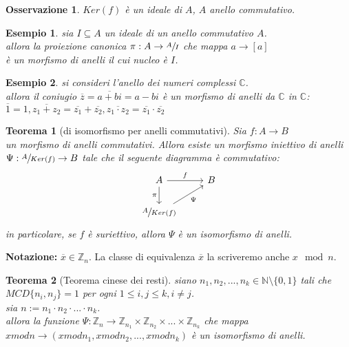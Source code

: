 \documentclass[a4paper,12pt]{article}
\theoremstyle{def}
\theoremstyle{prop}
\theoremstyle{esempio}
\newtheorem*{example}{Esempio}
\theoremstyle{dimostrazione}
\theoremstyle{teo}
\newtheorem*{teorema}{Teorema}
\theoremstyle{osservazione}
\newtheorem*{osservazione}{Osservazione}
\begin{document}
\begin{osservazione}
    \(Ker(f)\) è un ideale di \(A\), \(A\) anello commutativo.
\end{osservazione}

\begin{example}
    sia \(I \subseteq A\) un ideale di un anello commutativo \(A\).\\
    allora la proiezione canonica \(\pi : A \rightarrow \sfrac{A}{I}\) che mappa \(a \rightarrow [a]\)\\
    è un morfismo di anelli il cui nucleo è \(I\).
\end{example}

\begin{example}
    si consideri l'anello dei numeri complessi \(\mathbb{C}\).\\
    allora il coniugio \(\overline{z} = \overline{a+bi} = a - bi\) è un morfismo di anelli da \(\mathbb{C}\) in \(\mathbb{C}\):\\
    \(\overline{1} = 1, \overline{z_1 + z_2} = \overline{z_1} + \overline{z_2}, \overline{z_1 \cdot z_2} = \overline{z_1} \cdot \overline{z_2}\)
\end{example}

\begin{teorema}[di isomorfismo per anelli commutativi]
    Sia \(f : A \rightarrow B\)\\
    un morfismo di anelli commutativi. Allora esiste un morfismo iniettivo di anelli\\
    \(\Psi : \sfrac{A}{Ker(f)} \rightarrow B\) tale che il seguente diagramma è commutativo:
    \[
        \begin{tikzcd}
            A \arrow{r}{f} \arrow[swap]{d}{\pi} & B \\
            \sfrac{A}{Ker(f)} \arrow[swap]{ur}{\Psi}
        \end{tikzcd}
    \]
    in particolare, se \(f\) è suriettivo, allora \(\Psi\) è un isomorfismo di anelli.
\end{teorema}

\newpage

\textbf{Notazione:} \(\overline{x} \in \mathbb{Z}_n\). La classe di equivalenza \(\overline{x}\) la scriveremo anche  \(x \mod n\).

\begin{teorema} [Teorema cinese dei resti]
    siano \(n_1,n_2,...,n_k \in \mathbb{N} \setminus \{0,1\}\) tali che\\
    \(MCD \{n_i,n_j\} = 1\) per ogni \(1 \leq i,j \leq k, i \neq j\).\\
    sia \(n := n_1 \cdot n_2 \cdot ... \cdot n_k\).\\
    allora la funzione \(\Psi : \mathbb{Z}_n \rightarrow \mathbb{Z}_{n_1} \times \mathbb{Z}_{n_2} \times ... \times \mathbb{Z}_{n_k}\) che mappa\\
    \(x mod n \rightarrow (x mod n_1, x mod n_2, ..., x mod n_k)\) è un isomorfismo di anelli.\\
\end{teorema}
\end{document}
